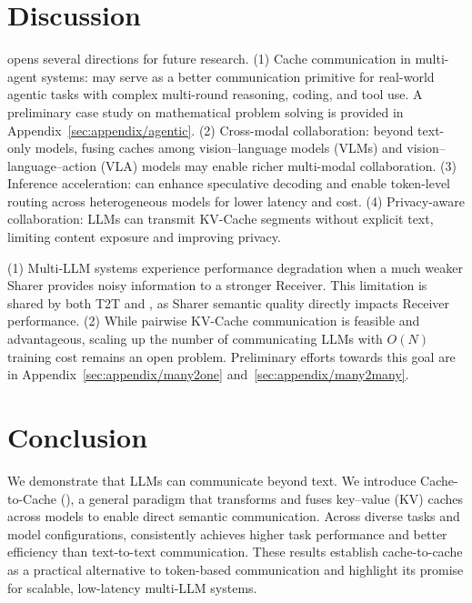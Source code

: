 \section{Discussion}

 \name opens several directions for future research.
(1) Cache communication in multi-agent systems: \name may serve as a better communication primitive for real-world agentic tasks with complex multi-round reasoning, coding, and tool use. A preliminary case study on mathematical problem solving is provided in Appendix~\ref{sec:appendix/agentic}. 
(2) Cross-modal collaboration: beyond text-only models, fusing caches among vision–language models (VLMs) and vision–language–action (VLA) models may enable richer multi-modal collaboration.
(3) Inference acceleration: \name can enhance speculative decoding and enable token-level routing across heterogeneous models for lower latency and cost.
(4) Privacy-aware collaboration: LLMs can transmit KV-Cache segments without explicit text, limiting content exposure and improving privacy.

 (1) Multi-LLM systems experience performance degradation when a much weaker Sharer provides noisy information to a stronger Receiver. This limitation is shared by both T2T and \name, as Sharer semantic quality directly impacts Receiver performance. (2) While pairwise KV-Cache communication is feasible and advantageous, scaling up the number of communicating LLMs with \(O(N)\) training cost remains an open problem. Preliminary efforts towards this goal are in Appendix~\ref{sec:appendix/many2one} and~\ref{sec:appendix/many2many}.

\section{Conclusion}
\label{sec:conclusion}
We demonstrate that LLMs can communicate beyond text. We introduce Cache-to-Cache (\name), a general paradigm that transforms and fuses key–value (KV) caches across models to enable direct semantic communication. Across diverse tasks and model configurations, \name consistently achieves higher task performance and better efficiency than text-to-text communication. These results establish cache-to-cache as a practical alternative to token-based communication and highlight its promise for scalable, low-latency multi-LLM systems.
